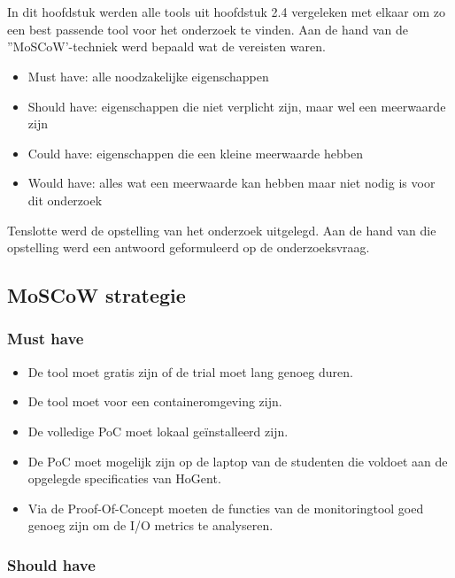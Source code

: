 \chapter{}
\label{ch:methodologie}

In dit hoofdstuk werden alle tools uit hoofdstuk 2.4 vergeleken met elkaar om zo een best passende tool voor het onderzoek te vinden. Aan de hand van de ''MoSCoW'-techniek werd bepaald wat de vereisten waren.
 
\begin{itemize}
    \item Must have: alle noodzakelijke eigenschappen
    \item Should have: eigenschappen die niet verplicht zijn, maar wel een meerwaarde zijn
    \item Could have: eigenschappen die een kleine meerwaarde hebben
    \item Would have: alles wat een meerwaarde kan hebben maar niet nodig is voor dit onderzoek
\end{itemize}

Tenslotte werd de opstelling van het onderzoek uitgelegd. Aan de hand van die opstelling werd een antwoord geformuleerd op de onderzoeksvraag.\clearpage

\section{MoSCoW strategie}
\subsection{Must have}
\begin{itemize}
    \item De tool moet gratis zijn of de trial moet lang genoeg duren.
    \item De tool moet voor een containeromgeving zijn.
    \item De volledige PoC moet lokaal geïnstalleerd zijn.
    \item De PoC moet mogelijk zijn op de laptop van de studenten die voldoet aan de opgelegde specificaties van HoGent.
    \item Via de Proof-Of-Concept moeten de functies van de monitoringtool goed genoeg zijn om de I/O metrics te analyseren.
\end{itemize}

\subsection{Should have}

